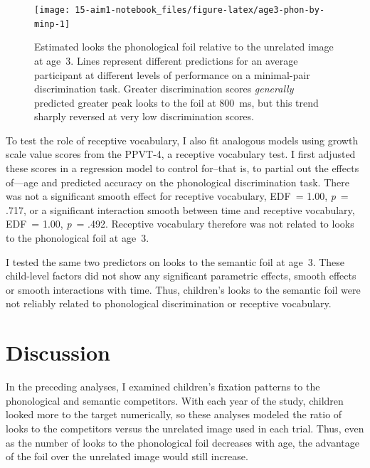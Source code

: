 \documentclass [11pt, proquest] {uwthesis}[2015/03/03]
\begin{document}
\begin{figure}
\texttt{[image: 15-aim1-notebook\_files/figure-latex/age3-phon-by-minp-1]} \caption{Estimated looks the phonological foil relative
to the unrelated image at age~3. Lines represent different predictions
for an average participant at different levels of performance on a
minimal-pair discrimination task. Greater discrimination scores
\emph{generally} predicted greater peak looks to the foil at 800~ms, but
this trend sharply reversed at very low discrimination scores.}\label{fig:age3-phon-by-minp}
\end{figure}
To test the role of receptive vocabulary, I also fit analogous models
using growth scale value scores from the PPVT-4, a receptive vocabulary
test. I first adjusted these scores in a regression model to control
for--that is, to partial out the effects of---age and predicted accuracy
on the phonological discrimination task. There was not a significant
smooth effect for receptive vocabulary, EDF~= 1.00, \emph{p}~= .717, or
a significant interaction smooth between time and receptive vocabulary,
EDF~= 1.00, \emph{p}~= .492. Receptive vocabulary therefore was not
related to looks to the phonological foil at age~3.

I tested the same two predictors on looks to the semantic foil at age~3.
These child-level factors did not show any significant parametric
effects, smooth effects or smooth interactions with time. Thus,
children's looks to the semantic foil were not reliably related to
phonological discrimination or receptive vocabulary.

\section{Discussion}\label{discussion-1}

In the preceding analyses, I examined children's fixation patterns to
the phonological and semantic competitors. With each year of the study,
children looked more to the target numerically, so these analyses
modeled the ratio of looks to the competitors versus the unrelated image
used in each trial. Thus, even as the number of looks to the
phonological foil decreases with age, the advantage of the foil over the
unrelated image would still increase.
\end{document}
